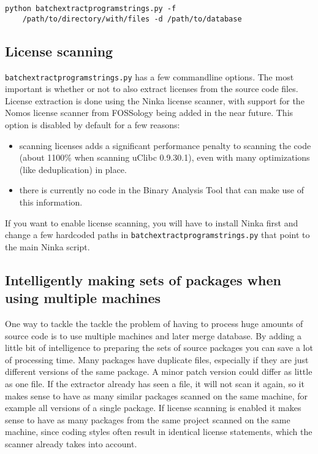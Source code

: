 \documentclass[10pt]{article}
\begin{document}
\begin{verbatim}
python batchextractprogramstrings.py -f
    /path/to/directory/with/files -d /path/to/database
\end{verbatim}

\subsection{License scanning}

\texttt{batchextractprogramstrings.py} has a few commandline options. The most
important is whether or not to also extract licenses from the source code files.
License extraction is done using the Ninka license scanner, with support
for the Nomos license scanner from FOSSology being added in the near future.
This option is disabled by default for a few reasons:

\begin{itemize}
\item scanning licenses adds a significant performance penalty to scanning the
code (about 1100\% when scanning uClibc 0.9.30.1), even with many
optimizations (like deduplication) in place.
\item there is currently no code in the Binary Analysis Tool that can make use
of this information.
\end{itemize}

If you want to enable license scanning, you will have to install Ninka first
and change a few hardcoded paths in \texttt{batchextractprogramstrings.py} that
point to the main Ninka script.

\subsection{Intelligently making sets of packages when using multiple machines}

One way to tackle the tackle the problem of having to process huge amounts of
source code is to use multiple machines and later merge database. By adding a
little bit of intelligence to preparing the sets of source packages you can
save a lot of processing time. Many packages have duplicate files, especially
if they are just different versions of the same package. A minor patch version
could differ as little as one file. If the extractor already has seen a file, it
will not scan it again, so it makes sense to have as many similar packages
scanned on the same machine, for example all versions of a single package. If
license scanning is enabled it makes sense to have as many packages from the
same project scanned on the same machine, since coding styles often result in
identical license statements, which the scanner already takes into account.
\end{document}
